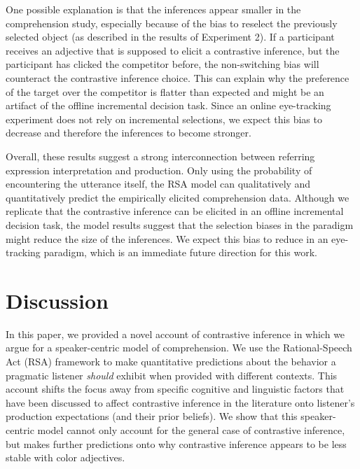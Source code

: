 \documentclass[10pt,letterpaper]{article}
\newcommand{\ek}[1]{\textcolor{Orange}{[ek: #1]}}
\begin{document}
One possible explanation is that the inferences appear smaller in the comprehension study, especially because of the bias to reselect the previously selected object (as described in the results of Experiment 2). If a participant receives an adjective that is supposed to elicit a contrastive inference, but the participant has clicked the competitor before, the non-switching bias will counteract the contrastive inference choice. This can explain why the preference of the target over the competitor is flatter than expected and might be an artifact of the offline incremental decision task. Since an online eye-tracking experiment does not rely on incremental selections, we expect this bias to decrease and therefore the inferences to become stronger.


Overall, these results suggest a strong interconnection between referring expression interpretation and production. Only using the probability of encountering the utterance itself, the RSA model can qualitatively and quantitatively predict the empirically elicited comprehension data. Although we replicate that the contrastive inference can be elicited in an offline incremental decision task, the model results suggest that the selection biases in the paradigm might reduce the size of the inferences. We expect this bias to reduce in an eye-tracking paradigm, which is an immediate future direction for this work.


\section{Discussion}

In this paper, we provided a novel account of contrastive inference in which we argue for a speaker-centric model of comprehension. We use the Rational-Speech Act (RSA) framework to make quantitative predictions about the behavior a pragmatic listener \textit{should} exhibit when provided with different contexts. This account shifts the focus away from specific cognitive and linguistic factors that have been discussed to affect contrastive inference in the literature onto listener's production expectations (and their prior beliefs). We show that this speaker-centric model cannot only account for the general case of contrastive inference, but makes further predictions onto why contrastive inference appears to be less stable with color adjectives. 
\end{document}
